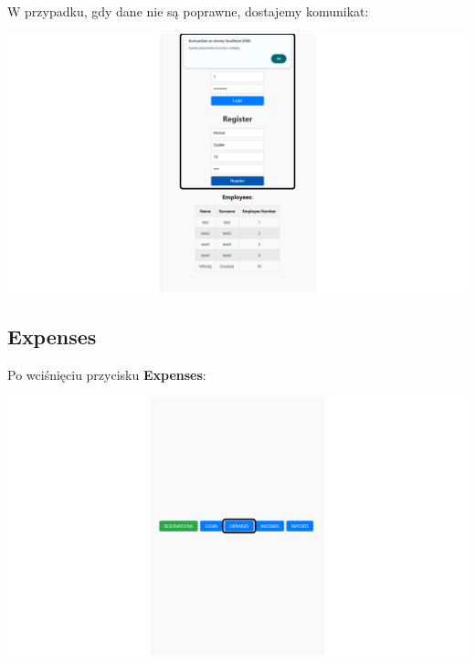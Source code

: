 \documentclass[12pt]{article}
\begin{document}
\begin{minipage}{\textwidth}
\noindent W przypadku, gdy dane nie są poprawne, dostajemy komunikat:
\begin{center}
\includegraphics[width=\textwidth]{media/Login_uniqueNumber.png}
\end{center}
\end{minipage}

\newpage
\subsection{Expenses}
\begin{minipage}{\textwidth}
\noindent Po wciśnięciu przycisku \textbf{Expenses}:
\begin{center}
\includegraphics[width=\textwidth]{media/Expenses.png}
\end{center}
\end{minipage}
\end{document}
